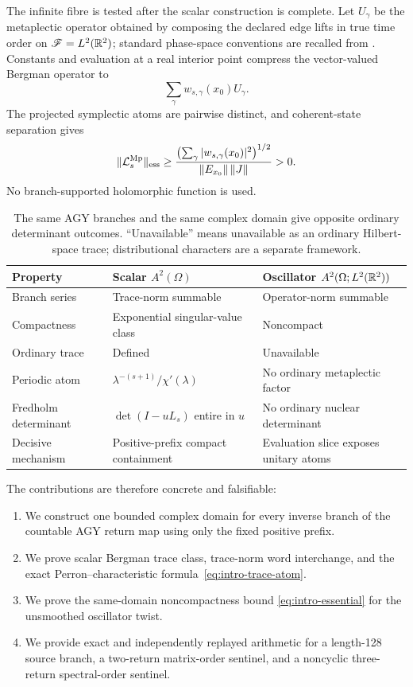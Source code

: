 The infinite fibre is tested after the scalar construction is complete.
Let \(U_\gamma\) be the metaplectic operator obtained by composing the
declared edge lifts in true time order on
\(\mathscr{F}=L^2(\mathbb{R}^2)\); standard phase-space conventions are recalled from
\citet{folland1989}.  Constants and evaluation at a real interior point
compress the vector-valued Bergman operator to
\[
 \sum_\gamma w_{s,\gamma}(x_0)U_\gamma.
\]
The projected symplectic atoms are pairwise distinct, and coherent-state
separation gives
\begin{equation}
 \|\mathcal{L}_s^{\rm Mp}\|_{\mathrm{ess}}
 \geq
 \frac{\bigl(\sum_\gamma|w_{s,\gamma}(x_0)|^2\bigr)^{1/2}}
 {\|E_{x_0}\|\,\|J\|}>0.
 \label{eq:intro-essential}
\end{equation}
No branch-supported holomorphic function is used.

\begin{table}[t]
\centering
\caption{The same AGY branches and the same complex domain give opposite
ordinary determinant outcomes.  ``Unavailable'' means unavailable as an
ordinary Hilbert-space trace; distributional characters are a separate
framework.}
\label{tab:hero}
\small
\begin{tabularx}{\textwidth}{@{}lXX@{}}
\toprule
Property & Scalar \(A^2(\Omega)\) &
Oscillator \(A^2(\Omega;L^2(\mathbb{R}^2))\) \\
\midrule
Branch series & Trace-norm summable & Operator-norm summable \\
Compactness & Exponential singular-value class & Noncompact \\
Ordinary trace & Defined & Unavailable \\
Periodic atom & \(\lambda^{-(s+1)}/\chi'(\lambda)\) &
No ordinary metaplectic factor \\
Fredholm determinant & \(\det(I-uL_s)\) entire in \(u\) &
No ordinary nuclear determinant \\
Decisive mechanism & Positive-prefix compact containment &
Evaluation slice exposes unitary atoms \\
\bottomrule
\end{tabularx}
\end{table}

The contributions are therefore concrete and falsifiable:
\begin{enumerate}
 \item We construct one bounded complex domain for every inverse branch of
 the countable AGY return map using only the fixed positive prefix.
 \item We prove scalar Bergman trace class, trace-norm word interchange, and
 the exact Perron--characteristic formula~\eqref{eq:intro-trace-atom}.
 \item We prove the same-domain noncompactness bound
 \eqref{eq:intro-essential} for the unsmoothed oscillator twist.
 \item We provide exact and independently replayed arithmetic for a
 length-128 source branch, a two-return matrix-order sentinel, and a
 noncyclic three-return spectral-order sentinel.
\end{enumerate}


